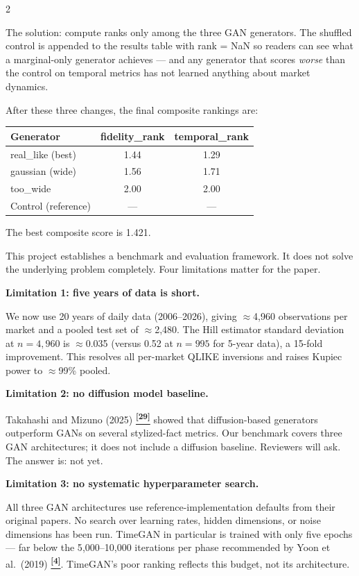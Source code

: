 \documentclass[10pt]{article}
\newcommand{\purplebox}[2]{\begin{tcolorbox}[mybox={Purple}{LBg},title={#1}]#2\end{tcolorbox}}
\newcommand{\tcite}[1]{%
  \hyperlink{R:#1}{\textsuperscript{\scriptsize\textbf{[#1]}}}}
\begin{document}
\begin{multicols}{2}
{The solution: compute ranks only among the three GAN generators. The shuffled control is appended to the results table with rank = NaN so readers can see what a marginal-only generator achieves --- and any generator that scores \emph{worse} than the control on temporal metrics has not learned anything about market dynamics.

\medskip
After these three changes, the final composite rankings are:

\begin{tabular}{@{}lcc@{}}
\toprule
Generator & fidelity\_rank & temporal\_rank \\
\midrule
real\_like (best)  & 1.44 & 1.29 \\
gaussian (wide)    & 1.56 & 1.71 \\
too\_wide          & 2.00 & 2.00 \\
\midrule
Control (reference) & --- & --- \\
\bottomrule
\end{tabular}

\smallskip
The best composite score is 1.421.}

\columnbreak

\purplebox{9\quad What We Still Cannot Do}{%
This project establishes a benchmark and evaluation framework. It does not solve the underlying problem completely. Four limitations matter for the paper.

\medskip
\textbf{Limitation 1: five years of data is short.}

We now use 20 years of daily data (2006--2026), giving $\approx$4{,}960 observations per market and a pooled test set of $\approx$2{,}480. The Hill estimator standard deviation at $n=4{,}960$ is $\approx$0.035 (versus 0.52 at $n=995$ for 5-year data), a 15-fold improvement. This resolves all per-market QLIKE inversions and raises Kupiec power to $\approx$99\% pooled.

\medskip
\textbf{Limitation 2: no diffusion model baseline.}

Takahashi and Mizuno (2025)\tcite{29} showed that diffusion-based generators outperform GANs on several stylized-fact metrics. Our benchmark covers three GAN architectures; it does not include a diffusion baseline. Reviewers will ask. The answer is: not yet.

\medskip
\textbf{Limitation 3: no systematic hyperparameter search.}

All three GAN architectures use reference-implementation defaults from their original papers. No search over learning rates, hidden dimensions, or noise dimensions has been run. TimeGAN in particular is trained with only five epochs --- far below the 5{,}000--10{,}000 iterations per phase recommended by Yoon et al.\ (2019)\tcite{4}. TimeGAN's poor ranking reflects this budget, not its architecture.

}
\end{multicols}
\end{document}
